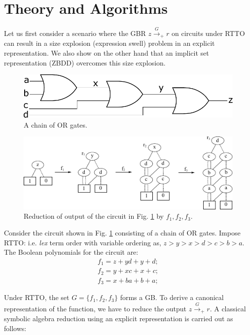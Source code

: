 \section{Theory and Algorithms}
\label{sec:theory}

Let us first consider a scenario where the GBR $z\xrightarrow{G}_+r$
on circuits under RTTO can result in a size explosion (expression
swell) problem in an explicit representation. We also show on the
other hand that an implicit set representation (ZBDD) overcomes 
this size explosion. 

\begin{figure}[hbt]
\centering
\includegraphics[scale=0.40]{Preliminaries-Theory/Chain_Or_Gates.pdf}
\caption{A chain of OR gates.}
\label{ChainOrGate}
\end{figure}


\begin{figure}[hbt]
\centering
\includegraphics[scale=1.4]{./Preliminaries-Theory/red_steps.pdf}
\caption{Reduction of output of the circuit in Fig. \ref{ChainOrGate} by $f_1,f_2,f_3$.}
\label{red_steps}
\end{figure}

Consider the circuit shown in Fig. \ref{ChainOrGate} consisting of a
chain of OR gates. Impose RTTO: i.e. {\it lex} term order with
variable ordering as, $z>y>x>d>c>b>a$. The Boolean polynomials for the
circuit are: 
\begin{align}
f_1 = z + y d + y +d;\\ 
f_2 = y + x c + x +c; \\
f_3 = x + b a + b +a;
\end{align}

Under RTTO, the set $G = \{f_1, f_2, f_3\}$ forms a GB. To derive a
canonical representation of the function, we have to reduce the
output $z\xrightarrow{G}_+r$. A classical symbolic algebra
reduction using an explicit representation is carried out as follows: 

